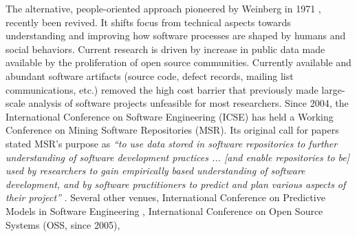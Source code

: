 The alternative, people-oriented approach pioneered by Weinberg in 1971 \cite{citeulike:262020}, recently been revived. 
It shifts focus from technical aspects towards understanding and improving how software processes are shaped by 
humans and social behaviors. 
Current research is driven by increase in public data made available by the proliferation 
of open source communities. Currently available and abundant software artifacts (source code, defect records, 
mailing list communications, etc.) removed the high cost barrier that previously made large-scale analysis of software 
projects unfeasible for most researchers. Since 2004, the International Conference on Software Engineering (ICSE) has 
held a Working Conference on Mining Software Repositories (MSR). 
Its original call for papers stated MSR's purpose as \textit{``to use data stored in software
repositories to further understanding of software development practices ... [and enable
repositories to be] used by researchers to gain empirically based understanding of software
development, and by software practitioners to predict and plan various aspects of their
project''} \cite{citeulike:7853299}. 
Several other venues, 
International Conference on Predictive Models in Software Engineering , 
International Conference on Open Source Systems (OSS, since 2005), 

